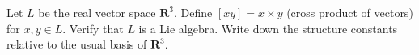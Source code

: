 Let $L$ be the real vector space $\mathbf{R}^3$. Define $[xy] = x \times y$ (cross product of vectors) for $x, y \in L$. Verify that $L$ is a Lie algebra. Write down the structure constants relative to the usual basis of $\mathbf{R}^3$.
